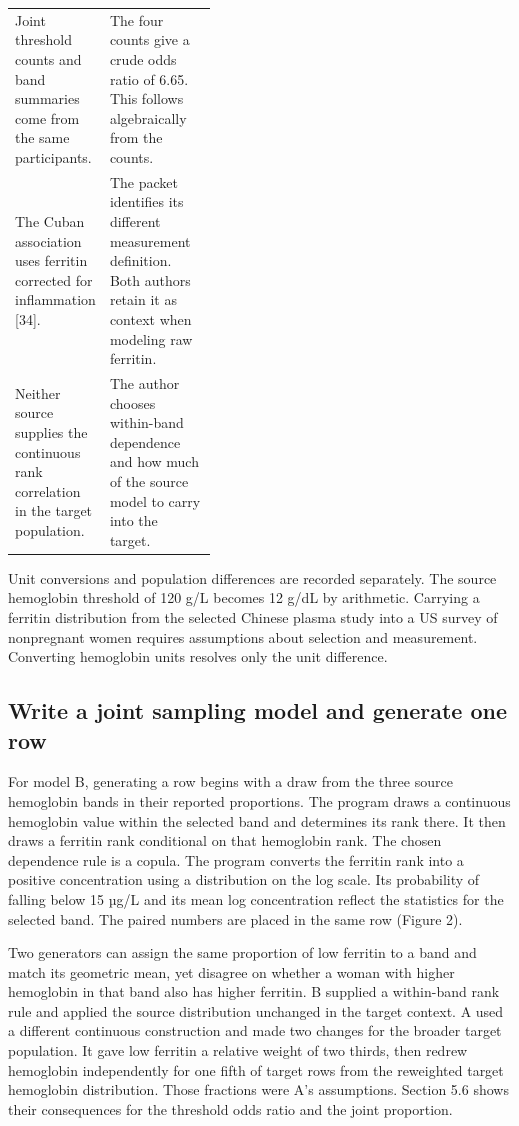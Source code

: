 \documentclass[11pt,letterpaper]{article}
\begin{document}
\begin{xltabular}{\linewidth}{@{}>{\raggedright\arraybackslash}p{0.40\linewidth}>{\raggedright\arraybackslash}X@{}}
Joint threshold counts and band summaries come from the same participants. & The four counts give a crude odds ratio of 6.65. This follows algebraically from the counts. \\

The Cuban association uses ferritin corrected for inflammation [34]. & The packet identifies its different measurement definition. Both authors retain it as context when modeling raw ferritin. \\

Neither source supplies the continuous rank correlation in the target population. & The author chooses within-band dependence and how much of the source model to carry into the target. \\

\end{xltabular}

\endgroup

Unit conversions and population differences are recorded separately. The source hemoglobin threshold of 120 g/\allowbreak{}L becomes 12 g/\allowbreak{}dL by arithmetic. Carrying a ferritin distribution from the selected Chinese plasma study into a US survey of nonpregnant women requires assumptions about selection and measurement. Converting hemoglobin units resolves only the unit difference.


\subsection{Write a joint sampling model and generate one row}

For model B, generating a row begins with a draw from the three source hemoglobin bands in their reported proportions. The program draws a continuous hemoglobin value within the selected band and determines its rank there. It then draws a ferritin rank conditional on that hemoglobin rank. The chosen dependence rule is a copula. The program converts the ferritin rank into a positive concentration using a distribution on the log scale. Its probability of falling below 15 µg/\allowbreak{}L and its mean log concentration reflect the statistics for the selected band. The paired numbers are placed in the same row (Figure 2).


Two generators can assign the same proportion of low ferritin to a band and match its geometric mean, yet disagree on whether a woman with higher hemoglobin in that band also has higher ferritin. B supplied a within-band rank rule and applied the source distribution unchanged in the target context. A used a different continuous construction and made two changes for the broader target population. It gave low ferritin a relative weight of two thirds, then redrew hemoglobin independently for one fifth of target rows from the reweighted target hemoglobin distribution. Those fractions were A's assumptions. Section 5.6 shows their consequences for the threshold odds ratio and the joint proportion.
\end{document}
